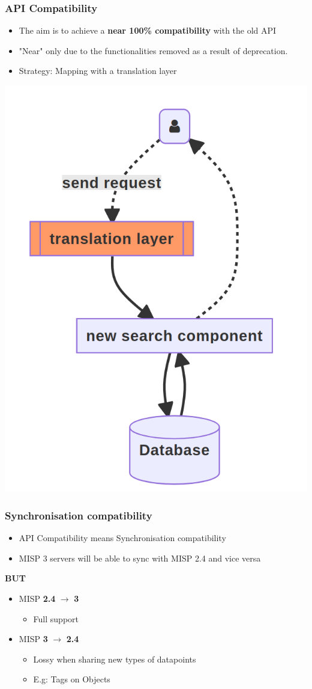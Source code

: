 \begin{frame}
    \frametitle{API Compatibility}
    \begin{itemize}
        \item The aim is to achieve a \textbf{near 100\% compatibility} with the old API
        \item "Near" only due to the functionalities removed as a result of deprecation.
        \item Strategy: Mapping with a translation layer
    \end{itemize}
    \begin{center}
        \includegraphics[width=0.35\linewidth]{pictures/api-translation.png}
    \end{center}
\end{frame}

\begin{frame}
    \frametitle{Synchronisation compatibility}
    \begin{itemize}
        \item API Compatibility means Synchronisation compatibility
        \item MISP 3 servers will be able to sync with MISP 2.4 and vice versa
    \end{itemize}
    \begin{center}
        \textbf{\large BUT}
    \end{center}
    \begin{itemize}
        \item MISP \textbf{2.4} $\rightarrow$ \textbf{3}
        \begin{itemize}
            \item Full support
        \end{itemize}
        \item MISP \textbf{3} $\rightarrow$ \textbf{2.4}
        \begin{itemize}
            \item Lossy when sharing new types of datapoints
            \item E.g: Tags on Objects
        \end{itemize}
    \end{itemize}
\end{frame}

